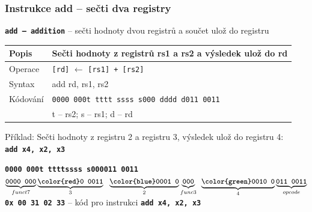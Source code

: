 \documentclass{beamer}
\begin{document}
\begin{frame}
\frametitle{Instrukce add -- sečti dva registry}

\textbf{\texttt{add -- addition}} -- sečti hodnoty dvou registrů a součet ulož do registru

\bigskip

\begin{tabular}{|l|l|}\hline
Popis & Sečti hodnoty z registrů rs1 a rs2 a výsledek ulož do rd \\ \hline
Operace & \texttt{[rd]} $\leftarrow$ \texttt{[rs1] + [rs2]} \\ \hline
Syntax & add rd, rs1, rs2 \\ \hline
Kódování & \texttt{0000 000t tttt ssss s000 dddd d011 0011} \\
 & t -- rs2; s -- rs1; d -- rd \\ \hline
\end{tabular}

\bigskip

Příklad: Sečti hodnoty z registru 2 a registru 3, výsledek ulož do registru 4:\\
\textbf{\texttt{add x4, x2, x3}}

\textbf{\texttt{0000 000\hspace{0.08cm}\color{red}t tttt}}\phantom{x}\hspace{0.13cm}\textbf{\texttt{\color{blue}ssss s}}\hspace{0.1cm}\textbf{\texttt{000\hspace{0.05cm}011 0011}}\\
$\underbrace{\textbf{\texttt{0000 000}}}_{funct7}
\underbrace{\textbf{\texttt{\color{red}0 0011}}}_{3}
\texttt{ }\underbrace{\textbf{\texttt{\color{blue}0001 0}}}_{2}
\underbrace{\textbf{\texttt{000}}}_{func3}\phantom{i}
\underbrace{\textbf{\texttt{\color{green}0010 0}}}_{4}
\underbrace{\textbf{\texttt{011 0011}}}_{opcode}$\\

\textbf{\texttt{0x 00 31 02 33}} -- kód pro instrukci \textbf{\texttt{add x4, x2, x3}}


\end{frame}
\end{document}
